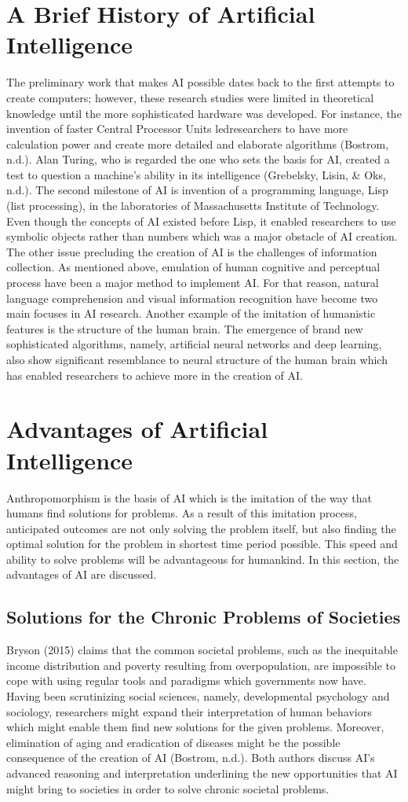 \documentclass[man]{apa6}
\begin{document}
\section{A Brief History of Artificial Intelligence}
The preliminary work that makes AI possible dates back to the first attempts to create computers; however, these research studies were limited in theoretical knowledge until the more
sophisticated hardware was developed. For instance, the invention of faster Central Processor Units ledresearchers to have more calculation power and create more detailed and elaborate algorithms (Bostrom, n.d.). Alan Turing, who is regarded the one who sets the basis for AI, created a test to question a machine's ability in its intelligence (Grebelsky, Lisin, \& Oks, n.d.). The second milestone of AI is invention of a programming language, Lisp (list processing), in the laboratories of Massachusetts Institute of Technology. Even though the concepts of AI existed before Lisp, it enabled researchers to use symbolic objects rather than numbers which was a major obstacle of AI creation. The other issue precluding the creation of AI is the challenges of information collection. As mentioned above, emulation of human cognitive and perceptual process have been a major method to implement AI. For that reason, natural language comprehension and visual information recognition have become two main focuses in AI research. Another example of the imitation of humanistic features is the structure of the human brain. The emergence of brand new sophisticated algorithms, namely, artificial neural networks and deep learning, also show significant resemblance to neural structure of the human brain which has
enabled researchers to achieve more in the creation of AI. 
\section{Advantages of Artificial Intelligence}
Anthropomorphism is the basis of AI which is the imitation of the way that humans find solutions for problems. As a result of this imitation process, anticipated outcomes are not only solving the problem itself, but also finding the optimal solution for the problem in shortest time period possible. This speed and ability to solve problems will be advantageous for humankind. In this section, the advantages of AI are discussed. 
\subsection{Solutions for the Chronic Problems of Societies}
Bryson (2015) claims that the common societal problems, such as the inequitable income distribution and poverty resulting from overpopulation, are impossible to cope with using regular tools and paradigms which governments now have. Having been scrutinizing social sciences, namely, developmental psychology and sociology, researchers might expand their interpretation of human behaviors which might enable them find new solutions for the given problems. Moreover, elimination of aging and eradication of diseases might be the possible consequence of the creation of AI (Bostrom, n.d.). Both authors discuss AI's advanced reasoning and interpretation underlining the new opportunities that AI might bring to societies in order to solve chronic societal problems.
\end{document}
